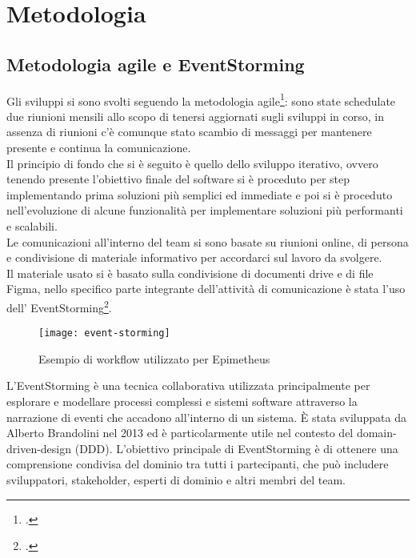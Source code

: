 \chapter{Metodologia}
\label{cap:metodologia}


\section{Metodologia agile e EventStorming}
\label{sec:metodologia-agile}

Gli sviluppi si sono svolti seguendo la metodologia agile\footcite{site:agile-manifesto}: sono state schedulate due riunioni mensili allo scopo di tenersi aggiornati sugli sviluppi in corso, in assenza di riunioni c'è comunque stato scambio di messaggi per mantenere presente e continua la comunicazione.\\
Il principio di fondo che si è seguito è quello dello sviluppo iterativo, ovvero tenendo presente l'obiettivo finale del software si è proceduto per step implementando prima soluzioni più semplici ed immediate e poi si è proceduto nell'evoluzione di alcune funzionalità per implementare soluzioni più performanti e scalabili. \\

Le comunicazioni all'interno del team si sono basate su riunioni online, di persona e condivisione di materiale informativo per accordarci sul lavoro da svolgere.\\
Il materiale usato si è basato sulla condivisione di documenti drive e di file Figma, nello specifico parte integrante dell'attività di comunicazione è stata l'uso dell' EventStorming\footcite{womak:event-storming}.\\

\begin{figure}[!ht] 
    \centering 
    \texttt{[image: event-storming]} 
    \caption{Esempio di workflow utilizzato per Epimetheus}
\end{figure}

L'EventStorming è una tecnica collaborativa utilizzata principalmente per esplorare e modellare processi complessi e sistemi software attraverso la narrazione di eventi che accadono all'interno di un sistema. È stata sviluppata da Alberto Brandolini nel 2013 ed è particolarmente utile nel contesto del \gls{domain-driven-design} (DDD). L'obiettivo principale di EventStorming è di ottenere una comprensione condivisa del dominio tra tutti i partecipanti, che può includere sviluppatori, stakeholder, esperti di dominio e altri membri del team.\\


